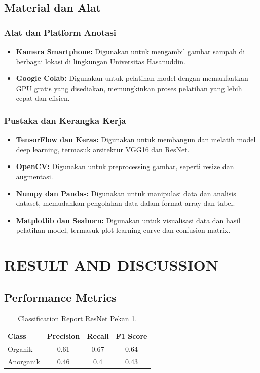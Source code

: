 \documentclass[12pt,a4paper]{article}
\begin{document}
\subsection{Material dan Alat}

\subsubsection{Alat dan Platform Anotasi}
\begin{itemize}
    \item \textbf{Kamera Smartphone:} Digunakan untuk mengambil gambar sampah di berbagai lokasi di lingkungan Universitas Hasanuddin.
    \item \textbf{Google Colab:} Digunakan untuk pelatihan model dengan memanfaatkan GPU gratis yang disediakan, memungkinkan proses pelatihan yang lebih cepat dan efisien.
\end{itemize}

\subsubsection{Pustaka dan Kerangka Kerja}
\begin{itemize}
    \item \textbf{TensorFlow dan Keras:} Digunakan untuk membangun dan melatih model deep learning, termasuk arsitektur VGG16 dan ResNet.
    \item \textbf{OpenCV:} Digunakan untuk preprocessing gambar, seperti resize dan augmentasi.
    \item \textbf{Numpy dan Pandas:} Digunakan untuk manipulasi data dan analisis dataset, memudahkan pengolahan data dalam format array dan tabel.
    \item \textbf{Matplotlib dan Seaborn:} Digunakan untuk visualisasi data dan hasil pelatihan model, termasuk plot learning curve dan confusion matrix.
\end{itemize}


\section{RESULT AND DISCUSSION}
\subsection{Performance Metrics}

\begin{table}[H]
\centering
\begin{tabular}{|l|c|c|c|}
    \hline
    \textbf{Class} & \textbf{Precision} & \textbf{Recall} & \textbf{F1 Score} \\
    \hline
    Organik & 0.61 & 0.67 & 0.64 \\
    Anorganik & 0.46 & 0.4 & 0.43 \\
    \hline
\end{tabular}
\caption{Classification Report ResNet Pekan 1.}
\label{tab:resnet_week1}
\end{table}
\end{document}
